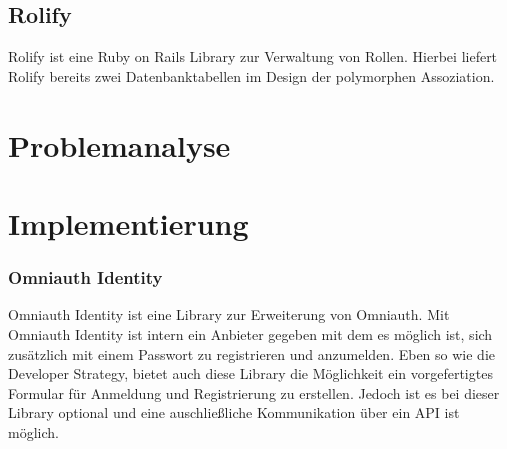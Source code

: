 \documentclass[11pt]{article}
\begin{document}
	\subsection{Rolify}
	\label{sec: rolify}
	Rolify ist eine Ruby on Rails Library zur Verwaltung von Rollen. Hierbei liefert Rolify bereits zwei Datenbanktabellen im Design der polymorphen Assoziation. 
	
	
	\section{Problemanalyse}
	\label{sec: analyze}
	
	\section{Implementierung}
	\label{sec: implementation}
	
	\subsubsection{Omniauth Identity}
	\label{sec: omniauth_identity}
	Omniauth Identity ist eine Library zur Erweiterung von Omniauth. Mit Omniauth Identity ist intern ein Anbieter gegeben mit dem es möglich ist, sich zusätzlich mit einem Passwort zu registrieren und anzumelden. Eben so wie die Developer Strategy, bietet auch diese Library die Möglichkeit ein vorgefertigtes Formular für Anmeldung und Registrierung zu erstellen. Jedoch ist es bei dieser Library optional und eine auschließliche Kommunikation über ein API ist möglich. 
	
\end{document}

